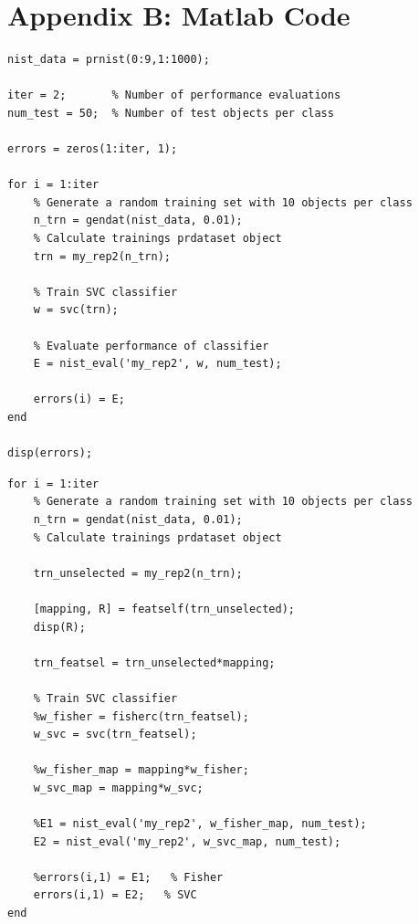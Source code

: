 \documentclass{article}
\begin{document}
\clearpage

\section{Appendix B: Matlab Code}

\begin{lstlisting}[caption=Script for performance evaluation,label=code:eval-script-scenario]
nist_data = prnist(0:9,1:1000);

iter = 2;       % Number of performance evaluations
num_test = 50;  % Number of test objects per class

errors = zeros(1:iter, 1);

for i = 1:iter
    % Generate a random training set with 10 objects per class 
    n_trn = gendat(nist_data, 0.01);
    % Calculate trainings prdataset object
    trn = my_rep2(n_trn);
    
    % Train SVC classifier
    w = svc(trn);
    
    % Evaluate performance of classifier
    E = nist_eval('my_rep2', w, num_test);
    
    errors(i) = E;
end

disp(errors);
\end{lstlisting}

\begin{lstlisting}[caption=Script for performance evaluation with feature selection,label=code:scenario2-test-featsel]
for i = 1:iter
    % Generate a random training set with 10 objects per class 
    n_trn = gendat(nist_data, 0.01);
    % Calculate trainings prdataset object

    trn_unselected = my_rep2(n_trn);

    [mapping, R] = featself(trn_unselected);
    disp(R);

    trn_featsel = trn_unselected*mapping;

    % Train SVC classifier
    %w_fisher = fisherc(trn_featsel);
    w_svc = svc(trn_featsel);
    
    %w_fisher_map = mapping*w_fisher;
    w_svc_map = mapping*w_svc;
    
    %E1 = nist_eval('my_rep2', w_fisher_map, num_test);
    E2 = nist_eval('my_rep2', w_svc_map, num_test);
    
    %errors(i,1) = E1;   % Fisher
    errors(i,1) = E2;   % SVC
end
\end{lstlisting}





\nocite{*}

\end{document}
